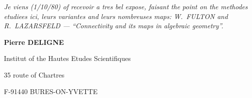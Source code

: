 \documentclass[12pt,a4paper]{article}
\begin{document}
\vspace{1ex}
\textit{Je viens (1/10/80) of recevoir a tres bel expose, faisant the point on the methodes etudiees ici, leurs variantes and leurs nombreuses maps: W.\ FULTON and R.\ LAZARSFELD --- ``Connectivity and its maps in algebraic geometry''.}

\vspace{2ex}
\begin{flushright}
\textbf{Pierre DELIGNE}

Institut of the Hautes Etudes Scientifiques

35 route of Chartres

F-91440 BURES-ON-YVETTE
\end{flushright}
\end{document}
